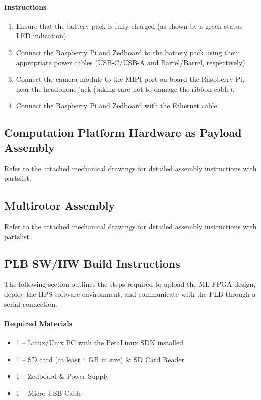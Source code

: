 \documentclass[10pt,letterpaper]{article}
\begin{document}
\paragraph{Instructions}
\begin{enumerate}
\item Ensure that the battery pack is fully charged (as shown by a green status LED indication).
\item Connect the Raspberry Pi and Zedboard to the battery pack using their appropriate power cables (USB-C/USB-A and Barrel/Barrel, respectively).
\item Connect the camera module to the MIPI port on-board the Raspberry Pi, near the headphone jack (taking care not to damage the ribbon cable).
\item Connect the Raspberry Pi and Zedboard with the Ethernet cable.
\end{enumerate}

\subsection{Computation Platform Hardware as Payload Assembly}
Refer to the attached mechanical drawings for detailed assembly instructions with partslist.

\subsection{Multirotor Assembly}
Refer to the attached mechanical drawings for detailed assembly instructions with partslist.

\subsection{PLB SW/HW Build Instructions}
\label{plb_setup}
The following section outlines the steps required to upload the ML FPGA design, deploy the HPS software environment, and communicate with the PLB through a serial connection.

\paragraph{Required Materials}
\begin{itemize}
\item 1 -- Linux/Unix PC with the PetaLinux SDK\cite{petalinux} installed
\item 1 -- SD card (at least 4 GB in size) \& SD Card Reader
\item 1 -- Zedboard \& Power Supply
\item 1 -- Micro USB Cable
\end{itemize}
\end{document}
